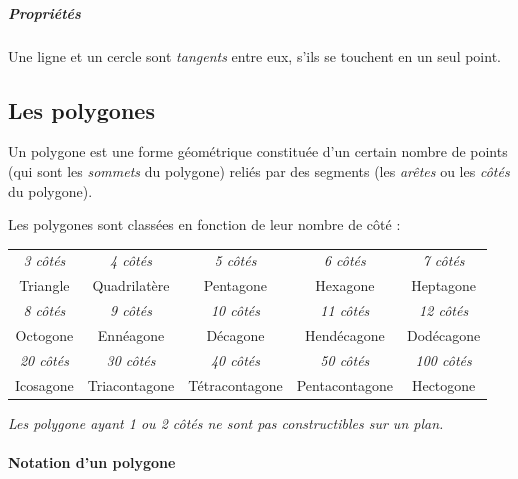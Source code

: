 \documentclass[a4paper, twoside]{article}
\begin{document}
\subparagraph*{Propriétés} Une ligne et un cercle sont \emph{tangents} entre eux,
s'ils se touchent en un seul point.

\newpage

\subsection{Les polygones} \label{polygones}

Un polygone est une forme géométrique constituée d'un certain nombre de points
(qui sont les \emph{sommets} du polygone) reliés par des segments (les \emph{arêtes}
ou les \emph{côtés} du polygone).

\medbreak

Les polygones sont classées en fonction de leur nombre de côté :

\begin{center}
	\begin{tabular}{|c|c|c|c|c|}
		\hline
		\textit{3 côtés}                  & \textit{4 côtés}  & \textit{5 côtés}  & \textit{6 côtés}  & \textit{7 côtés}                    \\

		Triangle                          & Quadrilatère      & Pentagone         & Hexagone          & Heptagone                           \\
		\hline
		\hline
		\textit{8 côtés}                  & \textit{9 côtés}  & \textit{10 côtés} & \textit{11 côtés} & \textit{12 côtés}                   \\

		Octogone                          & Ennéagone         & Décagone          & Hendécagone       & Dodécagone                          \\
		\hline
		\hline
		\textit{20 côtés}                 & \textit{30 côtés} & \textit{40 côtés} & \textit{50 côtés} & \textit{100 côtés}                  \\

		\phantom{cc}Icosagone\phantom{cc} & Triacontagone     & Tétracontagone    & Pentacontagone    & \phantom{cc} Hectogone \phantom{cc} \\
		\hline
	\end{tabular}
	\medbreak

	\textit{Les polygone ayant 1 ou 2 côtés ne sont pas constructibles sur un plan.}

\end{center}

\paragraph*{Notation d'un polygone}
\end{document}
